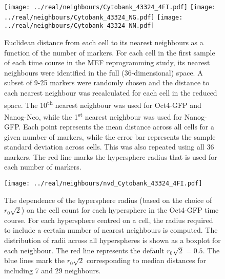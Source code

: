 \documentclass{article}
\begin{document}
\begin{figure}[p]
    \begin{center}
        \texttt{[image: ../real/neighbours/Cytobank\_43324\_4FI.pdf]}
        \texttt{[image: ../real/neighbours/Cytobank\_43324\_NG.pdf]}
        \texttt{[image: ../real/neighbours/Cytobank\_43324\_NN.pdf]}          
    \end{center}
    \caption{
        Euclidean distance from each cell to its nearest neighbours as a function of the number of markers.
        For each cell in the first sample of each time course in the MEF reprogramming study, its nearest neighbours were identified in the full (36-dimensional) space.
        A subset of 9-25 markers were randomly chosen and the distance to each nearest neighbour was recalculated for each cell in the reduced space.
        The 10\textsuperscript{th} nearest neighbour was used for Oct4-GFP and Nanog-Neo, while the 1\textsuperscript{st} nearest neighbour was used for Nanog-GFP.
        Each point represents the mean distance across all cells for a given number of markers, while the error bar represents the sample standard deviation across cells.
        This was also repeated using all 36 markers.
        The red line marks the hypersphere radius that is used for each number of markers.
    }
    \label{fig:radius}
\end{figure}

\begin{figure}[p]
    \begin{center}
        \texttt{[image: ../real/neighbours/nvd\_Cytobank\_43324\_4FI.pdf]}
    \end{center}
    \caption{The dependence of the hypersphere radius (based on the choice of $r_0\sqrt{2}$) on the cell count for each hypersphere in the Oct4-GFP time course.
        For each hypersphere centred on a cell, the radius required to include a certain number of nearest neighbours is computed.
        The distribution of radii across all hyperspheres is shown as a boxplot for each neighbour.
        The red line represents the default $r_0\sqrt{2}=0.5$.
        The blue lines mark the $r_0\sqrt{2}$ corresponding to median distances for including 7 and 29 neighbours.
    }
    \label{fig:nvd}
\end{figure}
\end{document}
